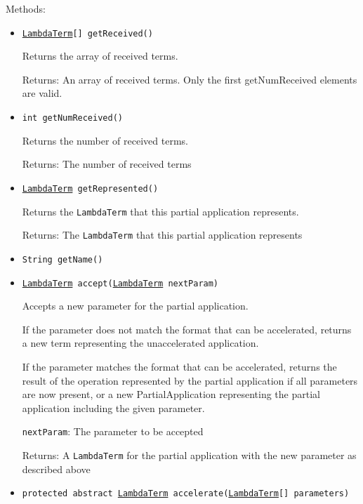 Methods:
\begin{itemize}
\item \texttt{\hyperref[type:edu.kit.wavelength.client.model.term.LambdaTerm]{LambdaTerm}[] getReceived()}

Returns the array of received terms.

Returns: An array of received terms. Only the first getNumReceived elements
         are valid.

\item \texttt{int getNumReceived()}

Returns the number of received terms.

Returns: The number of received terms

\item \texttt{\hyperref[type:edu.kit.wavelength.client.model.term.LambdaTerm]{LambdaTerm} getRepresented()}

Returns the \texttt{LambdaTerm} that this partial application represents.

Returns: The \texttt{LambdaTerm} that this partial application represents

\item \texttt{String getName()}



\item \texttt{\hyperref[type:edu.kit.wavelength.client.model.term.LambdaTerm]{LambdaTerm} accept(\hyperref[type:edu.kit.wavelength.client.model.term.LambdaTerm]{LambdaTerm} nextParam)}

Accepts a new parameter for the partial application.
 
 If the parameter does not match the format that can be accelerated, returns a
 new term representing the unaccelerated application.
 
 If the parameter matches the format that can be accelerated, returns the
 result of the operation represented by the partial application if all
 parameters are now present, or a new PartialApplication representing the
 partial application including the given parameter.

\texttt{nextParam}: The parameter to be accepted

Returns: A \texttt{LambdaTerm} for the partial application with the new
         parameter as described above

\item \texttt{protected abstract \hyperref[type:edu.kit.wavelength.client.model.term.LambdaTerm]{LambdaTerm} accelerate(\hyperref[type:edu.kit.wavelength.client.model.term.LambdaTerm]{LambdaTerm}[] parameters)}


\end{itemize}
